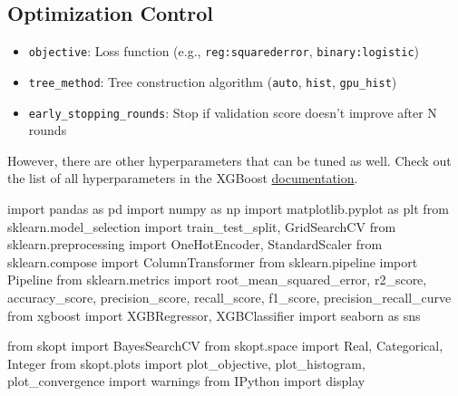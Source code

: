 \documentclass[
  letterpaper,
  DIV=11,
  numbers=noendperiod]{scrreprt}
\newenvironment{Shaded}{\begin{snugshade}}{\end{snugshade}}
\newcommand{\ImportTok}[1]{\textcolor[rgb]{0.00,0.46,0.62}{#1}}
\newcommand{\NormalTok}[1]{\textcolor[rgb]{0.00,0.23,0.31}{#1}}
\providecommand{\tightlist}{%
  \setlength{\itemsep}{0pt}\setlength{\parskip}{0pt}}\usepackage{longtable,booktabs,array}
\begin{document}
\subsection{Optimization Control}\label{optimization-control}

\begin{itemize}
\tightlist
\item
  \texttt{objective}: Loss function (e.g.,
  \texttt{\textquotesingle{}reg:squarederror\textquotesingle{}},
  \texttt{\textquotesingle{}binary:logistic\textquotesingle{}})\\
\item
  \texttt{tree\_method}: Tree construction algorithm
  (\texttt{\textquotesingle{}auto\textquotesingle{}},
  \texttt{\textquotesingle{}hist\textquotesingle{}},
  \texttt{\textquotesingle{}gpu\_hist\textquotesingle{}})\\
\item
  \texttt{early\_stopping\_rounds}: Stop if validation score doesn't
  improve after N rounds
\end{itemize}

However, there are other hyperparameters that can be tuned as well.
Check out the list of all hyperparameters in the XGBoost
\href{https://xgboost.readthedocs.io/en/stable/python/python_api.html\#}{documentation}.

\begin{Shaded}
\begin{Highlighting}[]
\ImportTok{import}\NormalTok{ pandas }\ImportTok{as}\NormalTok{ pd}
\ImportTok{import}\NormalTok{ numpy }\ImportTok{as}\NormalTok{ np}
\ImportTok{import}\NormalTok{ matplotlib.pyplot }\ImportTok{as}\NormalTok{ plt}
\ImportTok{from}\NormalTok{ sklearn.model\_selection }\ImportTok{import}\NormalTok{ train\_test\_split, GridSearchCV}
\ImportTok{from}\NormalTok{ sklearn.preprocessing }\ImportTok{import}\NormalTok{ OneHotEncoder, StandardScaler}
\ImportTok{from}\NormalTok{ sklearn.compose }\ImportTok{import}\NormalTok{ ColumnTransformer}
\ImportTok{from}\NormalTok{ sklearn.pipeline }\ImportTok{import}\NormalTok{ Pipeline}
\ImportTok{from}\NormalTok{ sklearn.metrics }\ImportTok{import}\NormalTok{ root\_mean\_squared\_error, r2\_score, accuracy\_score, precision\_score, recall\_score, f1\_score, precision\_recall\_curve}
\ImportTok{from}\NormalTok{ xgboost }\ImportTok{import}\NormalTok{ XGBRegressor, XGBClassifier}
\ImportTok{import}\NormalTok{ seaborn }\ImportTok{as}\NormalTok{ sns}

\ImportTok{from}\NormalTok{ skopt }\ImportTok{import}\NormalTok{ BayesSearchCV}
\ImportTok{from}\NormalTok{ skopt.space }\ImportTok{import}\NormalTok{ Real, Categorical, Integer}
\ImportTok{from}\NormalTok{ skopt.plots }\ImportTok{import}\NormalTok{ plot\_objective, plot\_histogram, plot\_convergence}
\ImportTok{import}\NormalTok{ warnings}
\ImportTok{from}\NormalTok{ IPython }\ImportTok{import}\NormalTok{ display}
\end{Highlighting}
\end{Shaded}
\end{document}
